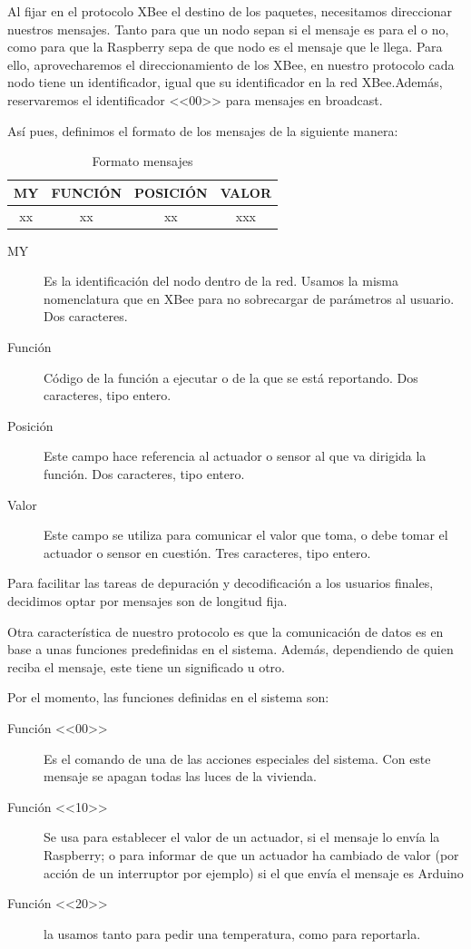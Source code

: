 Al fijar en el protocolo XBee el destino de los paquetes, necesitamos  direccionar nuestros mensajes. Tanto para que un nodo sepan si el mensaje es para el o no, como para que la Raspberry sepa de que nodo es el mensaje que le llega. Para ello, aprovecharemos el direccionamiento de los XBee, en nuestro protocolo cada nodo tiene un identificador, igual que su identificador en la red XBee.Además, reservaremos el identificador <<00>> para mensajes en broadcast.

Así pues, definimos el formato de los mensajes de la siguiente manera:

\begin{table}[h]
    \centering
    \begin{tabular}{cccc}
        \toprule
        MY & FUNCIÓN & POSICIÓN & VALOR \\ \toprule
        xx & xx      & xx       & xxx  \\ \bottomrule
    \end{tabular}
    \caption{Formato mensajes}
    \label{tab:formatoMensajes}
\end{table}


\begin{description}
    \item[MY] Es la identificación del nodo dentro de la red. Usamos la misma nomenclatura que en XBee para no sobrecargar de parámetros al usuario. Dos caracteres.
    \item[Función] Código de la función a ejecutar o de la que se está reportando. Dos caracteres, tipo entero.
    \item[Posición] Este campo hace referencia al actuador o sensor al que va dirigida la función. Dos caracteres, tipo entero.
    \item[Valor] Este campo se utiliza para comunicar el valor que toma, o debe tomar el actuador o sensor en cuestión. Tres caracteres, tipo entero.
\end{description}

Para facilitar las tareas de depuración y decodificación a los usuarios finales, decidimos optar por mensajes son de longitud fija.

Otra característica de nuestro protocolo es que la  comunicación de datos es en base a unas funciones predefinidas en el sistema. Además, dependiendo de quien reciba el mensaje, este tiene un significado u otro.

Por el momento, las funciones definidas en el sistema son:

\begin{description}
    \item[Función <<00>>] Es el comando de una de las acciones especiales del sistema. Con este mensaje se apagan todas las luces de la vivienda.
    \item[Función <<10>>] Se usa para establecer el valor de un actuador, si el mensaje lo envía la Raspberry; o para informar de que un actuador ha cambiado de valor (por acción de un interruptor por ejemplo) si el que envía el mensaje es Arduino
    \item[Función <<20>>] la usamos tanto para pedir una temperatura, como para reportarla.
\end{description}

